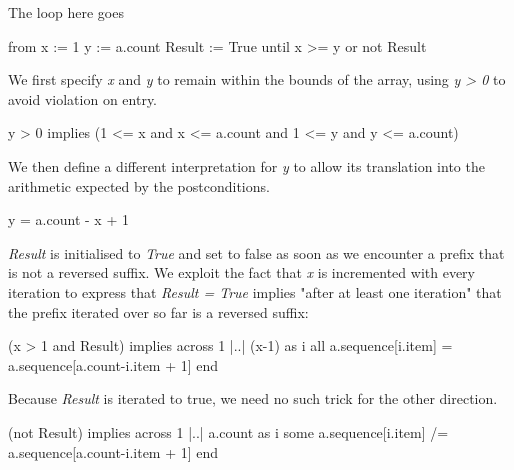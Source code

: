 The loop here goes
\begin{eSimple}
from
	x := 1
	y := a.count
	Result := True
until
	x >= y or not Result
\end{eSimple}
We first specify \emph{x} and \emph{y} to remain within the bounds of the array, using \emph{y > 0} to avoid violation on entry.
\begin{eSimple}
y > 0 implies (1 <= x and x <= a.count and 1 <= y and y <= a.count)
\end{eSimple}

We then define a different interpretation for \emph{y} to allow its translation into the arithmetic expected by the postconditions.
\begin{eSimple}
y = a.count - x + 1
\end{eSimple}

\emph{Result} is initialised to \emph{True} and set to false as soon as we encounter a prefix that is not a reversed suffix. We exploit the fact that \emph{x} is incremented with every iteration to express that \emph{Result = True} implies "after at least one iteration" that the prefix iterated over so far is a reversed suffix:
\begin{eSimple}
(x > 1 and Result) implies across 1 |..| (x-1) as i all a.sequence[i.item] = a.sequence[a.count-i.item + 1] end
\end{eSimple}
Because \emph{Result} is iterated to true, we need no such trick for the other direction.
\begin{eSimple}
(not Result) implies across 1 |..| a.count as i some a.sequence[i.item] /= a.sequence[a.count-i.item + 1] end
\end{eSimple}